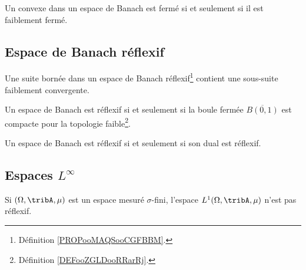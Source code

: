 \begin{proposition}       \label{PROPooYARHooOpmztY}
	Un convexe dans un espace de Banach est fermé si et seulement si il est faiblement fermé.
\end{proposition}

\subsection{Espace de Banach réflexif}

\begin{proposition}       \label{PROPooPVVYooMZjQSq}
	Une suite bornée dans un espace de Banach réflexif\footnote{Définition \ref{PROPooMAQSooCGFBBM}.} contient une sous-suite faiblement convergente.
\end{proposition}

\begin{theorem}       \label{THOooTFIHooPQjVAr}
	Un espace de Banach est réflexif si et seulement si la boule fermée \( \overline{ B(0,1) }\) est compacte pour la topologie faible\footnote{Définition \ref{DEFooZGLDooRRarRj}.}.
\end{theorem}

\begin{proposition}       \label{PROPooBBNBooGcXDRH}
	Un espace de Banach est réflexif si et seulement si son dual est réflexif.
\end{proposition}

\subsection{Espaces \texorpdfstring{\(  L^{\infty}\)}{Linfinity}}

\begin{lemma}        \label{LEMooMSYAooGEMgoc}
	Si \( (\Omega,\tribA,\mu)\) est un espace mesuré \( \sigma\)-fini, l'espace \( L^1(\Omega,\tribA,\mu)\) n'est pas réflexif.
\end{lemma}

